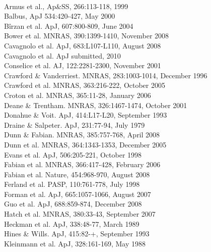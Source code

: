 \documentclass[12pt]{article}
\begin{document}
\\
\noindent [1] Armus et al., Ap\&SS, 266:113-118, 1999\\
\noindent [2] Balbus, ApJ 534:420-427, May 2000\\
\noindent [3] B\^irzan et al. ApJ, 607:800-809, June 2004\\
\noindent [4] Bower et al. MNRAS, 390:1399-1410, November 2008\\
\noindent [5] Cavagnolo et al. ApJ, 683:L107-L110, August 2008\\
\noindent [6] Cavagnolo et al. ApJ submitted, 2010\\
\noindent [7] Conselice et al. AJ, 122:2281-2300, November 2001\\
\noindent [8] Crawford \& Vanderriest. MNRAS, 283:1003-1014, December 1996\\
\noindent [9] Crawford et al. MNRAS, 363:216-222, October 2005\\
\noindent [10] Croton et al. MNRAS, 365:11-28, January 2006\\
\noindent [11] Deane \& Trentham. MNRAS, 326:1467-1474, October 2001\\
\noindent [12] Donahue \& Voit. ApJ, 414:L17-L20, September 1993\\
\noindent [13] Draine \& Salpeter. ApJ, 231:77-94, July 1979\\
\noindent [14] Dunn \& Fabian. MNRAS, 385:757-768, April 2008\\
\noindent [15] Dunn et al. MNRAS, 364:1343-1353, December 2005\\
\noindent [16] Evans et al. ApJ, 506:205-221, October 1998\\
\noindent [17] Fabian et al. MNRAS, 366:417-428, February 2006\\
\noindent [18] Fabian et al. Nature, 454:968-970, August 2008\\
\noindent [19] Ferland et al. PASP, 110:761-778, July 1998\\
\noindent [20] Forman et al. ApJ, 665:1057-1066, August 2007\\
\noindent [21] Guo et al. ApJ, 688:859-874, December 2008\\
\noindent [22] Hatch et al. MNRAS, 380:33-43, September 2007\\
\noindent [23] Heckman et al. ApJ, 338:48-77, March 1989\\
\noindent [24] Hines \& Wills. ApJ, 415:82-+, September 1993\\
\noindent [25] Kleinmann et al. ApJ, 328:161-169, May 1988\\
\end{document}
